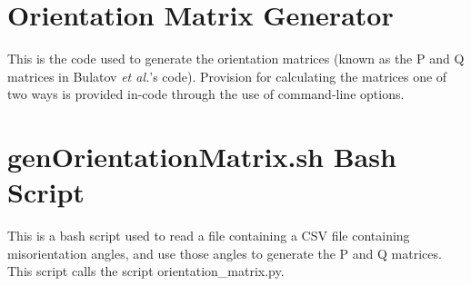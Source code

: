 \documentclass[12pt]{report}
\begin{document}
\appendix
\chapter{Orientation Matrix Generator}
This is the code used to generate the orientation matrices (known as the P and Q matrices in Bulatov \emph{et al.}'s code). Provision for calculating the matrices one of two ways is provided in-code through the use of command-line options.



\chapter{genOrientationMatrix.sh Bash Script}
This is a bash script used to read a file containing a CSV file containing misorientation angles, and use those angles to generate the P and Q matrices.  This script calls the script orientation\_matrix.py.


\end{document}

